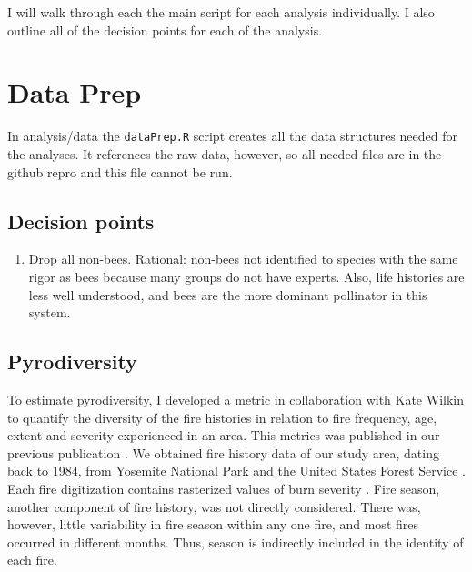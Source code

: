 \documentclass{article}\usepackage[]{graphicx}\usepackage[]{color}
\begin{document}
I will walk through each the main script for each analysis
individually. I also outline all of the decision points for each of
the analysis.



\section{Data Prep}
\label{sec:dataprep}

In analysis/data the \texttt{dataPrep.R} script creates all the data
structures needed for the analyses. It references the raw data,
however, so all needed files are in the github repro and this file
cannot be run.

\subsection{Decision points} 
\begin{enumerate}
\item Drop all non-bees. Rational: non-bees not identified to species
  with the same rigor as bees because many groups do not have
  experts. Also, life histories are less well understood, and bees are
  the more dominant pollinator in this system.
\end{enumerate}


\subsection{Pyrodiversity}
\label{sec:pyrodiv}

To estimate pyrodiversity, I developed a metric in collaboration with
Kate Wilkin to quantify the diversity of the fire histories in
relation to fire frequency, age, extent and severity experienced in an
area. This metrics was published in our previous publication
\citep{ponisio2016pyrodiversity}. We obtained fire history data of our
study area, dating back to 1984, from Yosemite National Park and the
United States Forest Service \citep{van2012factors,
  miller2012Yosemite, yose2012Yosemite}.  Each fire digitization
contains rasterized values of burn severity
\citep{miller2007quantifying}.  Fire season, another component of fire
history, was not directly considered.  There was, however, little
variability in fire season within any one fire, and most fires
occurred in different months.  Thus, season is indirectly included in
the identity of each fire.
\end{document}
